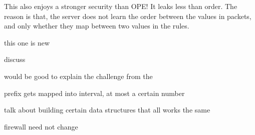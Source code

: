 This also enjoys a stronger security than OPE! It leaks less than order.
The reason is that, the server does not learn the order between the values in packets, and only whether they map between two values in the rules. 

this one is new

discuss 

would be good to explain the challenge from the 


prefix gets mapped into interval, at most a certain number

talk about building certain data structures that all works the same

firewall need not change 
